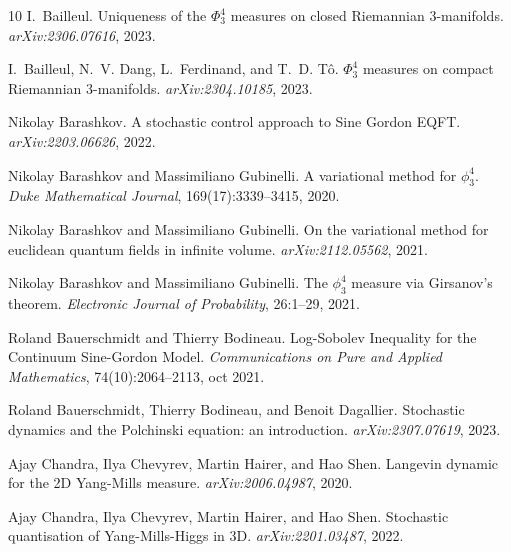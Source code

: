 \documentclass[reprint,aps]{revtex4-2}
\newcommand{\tmtextit}[1]{\textit{{{#1}}}}
\begin{document}
\begin{thebibliography}{10}
  I.~Bailleul.
  {\newblock}Uniqueness of the $\Phi^4_3$ measures on closed Riemannian
  $3$-manifolds. {\newblock}\tmtextit{arXiv:2306.07616}, 2023.
  
  I.~Bailleul, N.~V. Dang,
  L.~Ferdinand, and T.~D. T{\^o}. {\newblock}$\Phi^4_3$ measures on compact
  Riemannian $3$-manifolds. {\newblock}\tmtextit{arXiv:2304.10185}, 2023.
  
  Nikolay Barashkov.
  {\newblock}A stochastic control approach to Sine Gordon EQFT.
  {\newblock}\tmtextit{arXiv:2203.06626}, 2022.
  
  Nikolay Barashkov and Massimiliano
  Gubinelli. {\newblock}A variational method for $\phi^4_3$.
  {\newblock}\tmtextit{Duke Mathematical Journal}, 169(17):3339--3415, 2020.
  
  Nikolay Barashkov and Massimiliano
  Gubinelli. {\newblock}On the variational method for euclidean quantum fields
  in infinite volume. {\newblock}\tmtextit{arXiv:2112.05562}, 2021.
  
  Nikolay Barashkov and Massimiliano Gubinelli.
  {\newblock}The $\phi^4_3$ measure via Girsanov's theorem.
  {\newblock}\tmtextit{Electronic Journal of Probability}, 26:1--29, 2021.
  
  Roland Bauerschmidt and
  Thierry Bodineau. {\newblock}Log-Sobolev Inequality for the Continuum
  Sine-Gordon Model. {\newblock}\tmtextit{Communications on Pure and Applied
  Mathematics}, 74(10):2064--2113, oct 2021.
  
  Roland
  Bauerschmidt, Thierry Bodineau, and Benoit Dagallier. {\newblock}Stochastic
  dynamics and the Polchinski equation: an introduction.
  {\newblock}\tmtextit{arXiv:2307.07619}, 2023.
  
  Ajay Chandra, Ilya Chevyrev, Martin
  Hairer, and Hao Shen. {\newblock}Langevin dynamic for the 2D Yang-Mills
  measure. {\newblock}\tmtextit{arXiv:2006.04987}, 2020.
  
  Ajay Chandra,
  Ilya Chevyrev, Martin Hairer, and Hao Shen. {\newblock}Stochastic
  quantisation of Yang-Mills-Higgs in 3D.
  {\newblock}\tmtextit{arXiv:2201.03487}, 2022.
  

\end{thebibliography}
\end{document}
